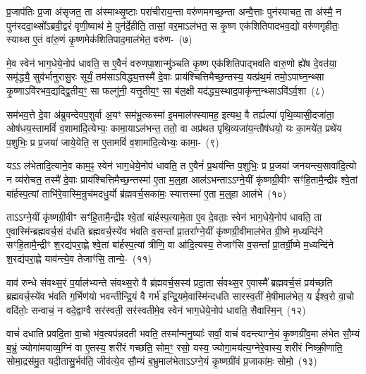 प्र॒जा\-प॑तिः प्र॒जा अ॑सृजत॒ ता अ॑स्माथ्सृ॒ष्टाः परा॑चीराय॒न्ता वरु॑णमगच्छ॒न्ता अन्वै॒त्ताः पुन॑रयाचत॒ ता अ॑स्मै॒ न पुन॑रददा॒थ्सो᳚\-ऽब्रवी॒द्वरं॑ वृणी॒ष्वाथ॑ मे॒ पुन॑र्दे॒हीति॒ तासां॒ वर॒मा\-ऽल॑भत॒ स कृ॒ष्ण एक॑शितिपादभव॒द्यो वरु॑णगृहीतः॒ स्याथ्स ए॒तं वा॑रु॒णं कृ॒ष्णमेक॑शितिपाद॒मा\-ल॑भेत॒ वरु॑ण-~(७)

मे॒व स्वेन॑ भाग॒धेये॒नोप॑ धावति॒ स ए॒वैनं॑ वरुणपा॒शान्मु॑ञ्चति कृ॒ष्ण एक॑शितिपाद्भवति वारु॒णो ह्ये॑ष दे॒वत॑या॒ समृ॑द्ध्यै॒ सुव॑र्भानुरासु॒रः सूर्यं॒ तम॑सा\-ऽविद्ध्य॒त्तस्मै॑ दे॒वाः प्राय॑श्चित्तिमैच्छ॒न्तस्य॒ यत्प्र॑थ॒मं तमो॒\-ऽपाघ्न॒न्थ्सा कृ॒ष्णा\-ऽवि॑रभव॒द्यद्द्वि॒तीय॒ꣳ॒ सा फल्गु॑नी॒ यत्तृ॒तीय॒ꣳ॒ सा ब॑ल॒क्षी यद॑द्ध्य॒स्थाद॒पाकृ॑न्त॒न्थ्सा\-ऽवि॑\-ऽर्व॒शा~(८)

सम॑भव॒त्ते दे॒वा अ॑ब्रुवन्देवप॒शुर्वा अ॒यꣳ सम॑भू॒त्कस्मा॑ इ॒ममाल॑फ्स्यामह॒ इत्यथ॒ वै तर्ह्यल्पा॑ पृथि॒व्यासी॒दजा॑ता॒ ओष॑धय॒स्तामविं॑ व॒शामा॑दि॒त्येभ्यः॒ कामा॒या\-ऽल॑भन्त॒ ततो॒ वा अप्र॑थत पृथि॒व्यजा॑य॒न्तौष॑धयो॒ यः का॒मये॑त॒ प्रथे॑य प॒शुभिः॒ प्र प्र॒जया॑ जाये॒येति॒ स ए॒तामविं॑ व॒शामा॑दि॒त्येभ्यः॒ कामा॒-~(९)

यऽऽ ल॑भेतादि॒त्याने॒व काम॒ꣴ॒ स्वेन॑ भाग॒धेये॒नोप॑ धावति॒ त ए॒वैनं॑ प्र॒थय॑न्ति प॒शुभिः॒ प्र प्र॒जया॑ जनयन्त्य॒सावा॑दि॒त्यो न व्य॑रोचत॒ तस्मै॑ दे॒वाः प्राय॑श्चित्तिमैच्छ॒न्तस्मा॑ ए॒ता म॒ल्॒\mbox{}हा आल॑\-ऽभन्ताऽऽग्ने॒यीं कृ॑ष्णग्री॒वीꣳ सꣳ॑हि॒तामै॒न्द्रीꣴ श्वे॒तां बा॑र्\mbox{}हस्प॒त्यां ताभि॑रे॒वास्मि॒न्रुच॑मदधु॒र्यो ब्र॑ह्मवर्च॒सका॑मः॒ स्यात्तस्मा॑ ए॒ता म॒ल्॒\mbox{}हा आल॑भे\-~(१०)

ताऽऽग्ने॒यीं कृ॑ष्णग्री॒वीꣳ सꣳ॑हि॒तामै॒न्द्रीꣴ श्वे॒तां बा॑र्\mbox{}हस्प॒त्या\-मे॒ता ए॒व दे॒वताः॒ स्वेन॑ भाग॒धेये॒नोप॑ धावति॒ ता ए॒वास्मि॑न्ब्रह्मवर्च॒सं द॑धति ब्रह्मवर्च॒स्ये॑व भ॑वति व॒सन्ता᳚ प्रा॒तरा᳚ग्ने॒यीं कृ॑ष्णग्री॒वीमाल॑भेत ग्री॒ष्मे म॒ध्यन्दि॑ने सꣳहि॒तामै॒न्द्रीꣳ श॒रद्य॑परा॒ह्णे श्वे॒तां बा॑र्\mbox{}हस्प॒त्यां त्रीणि॒ वा आ॑दि॒त्यस्य॒ तेजाꣳ॑सि व॒सन्ता᳚ प्रा॒तर्ग्री॒ष्मे म॒ध्यन्दि॑ने श॒रद्य॑परा॒ह्णे याव॑न्त्ये॒व तेजाꣳ॑सि॒ तान्ये॒-~(११)

वाव॑ रुन्धे संवथ्स॒रं प॒र्याल॑भ्यन्ते संवथ्स॒रो वै ब्र॑ह्मवर्च॒सस्य॑ प्रदा॒ता सं॑वथ्स॒र ए॒वास्मै᳚ ब्रह्मवर्च॒सं प्रय॑च्छति ब्रह्मवर्च॒स्ये॑व भ॑वति ग॒र्भिण॑यो भवन्तीन्द्रि॒यं वै गर्भ॑ इन्द्रि॒यमे॒वास्मि॑न्दधति सारस्व॒तीं मे॒षीमा\-ल॑भेत॒ य ई᳚श्व॒रो वा॒चो वदि॑तोः॒ सन्वाचं॒ न वदे॒द्वाग्वै सर॑स्वती॒ सर॑स्वतीमे॒व स्वेन॑ भाग॒धेये॒नोप॑ धावति॒ सैवास्मि॒न्~(१२)

वाचं॑ दधाति प्रवदि॒ता वा॒चो भ॑व॒त्यप॑न्नदती भवति॒ तस्मा᳚न्मनु॒ष्याः᳚ सर्वां॒ वाचं॑ वदन्त्याग्ने॒यं कृ॒ष्णग्री॑व॒मा ल॑भेत सौ॒म्यं ब॒भ्रुं ज्योगा॑मयाव्य॒ग्निं वा ए॒तस्य॒ शरी॑रं गच्छति॒ सोम॒ꣳ॒ रसो॒ यस्य॒ ज्योगा॒मय॑त्य॒ग्नेरे॒वास्य॒ शरी॑रं निष्क्री॒णाति॒ सोमा॒द्रस॑मु॒त यदी॒तासु॒र्भव॑ति॒ जीव॑त्ये॒व सौ॒म्यं ब॒भ्रुमा\-ल॑भेताऽऽग्ने॒यं कृ॒ष्णग्री॑वं प्र॒जाका॑मः॒ सोमो॒~(१३)

